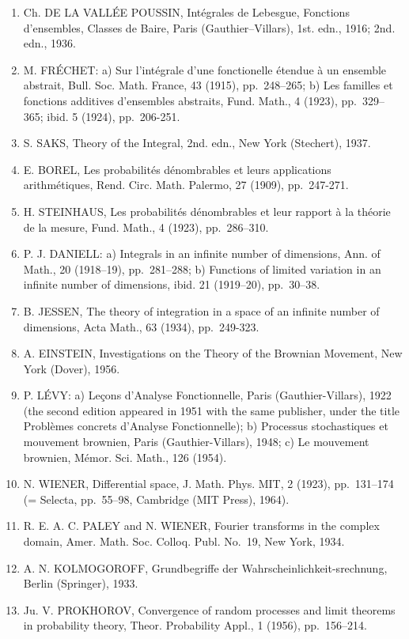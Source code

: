 \begin{enumerate}
\def\labelenumi{(\Roman{enumi})}
\item
  Ch. DE LA VALLÉE POUSSIN, Intégrales de Lebesgue, Fonctions d'ensembles, Classes de Baire, Paris (Gauthier--Villars), 1st. edn., 1916; 2nd. edn., 1936.
\item
  M. FRÉCHET: a) Sur l'intégrale d'une fonctionelle étendue à un ensemble abstrait, Bull. Soc. Math. France, 43 (1915), pp.~248--265; b) Les familles et fonctions additives d'ensembles abstraits, Fund. Math., 4 (1923), pp.~329--365; ibid. 5 (1924), pp.~206-251.
\item
  S. SAKS, Theory of the Integral, 2nd. edn., New York (Stechert), 1937.
\item
  E. BOREL, Les probabilités dénombrables et leurs applications arithmétiques, Rend. Circ. Math. Palermo, 27 (1909), pp.~247-271.
\item
  H. STEINHAUS, Les probabilités dénombrables et leur rapport à la théorie de la mesure, Fund. Math., 4 (1923), pp.~286--310.
\item
  P. J. DANIELL: a) Integrals in an infinite number of dimensions, Ann. of Math., 20 (1918--19), pp.~281--288; b) Functions of limited variation in an infinite number of dimensions, ibid. 21 (1919--20), pp.~30--38.
\item
  B. JESSEN, The theory of integration in a space of an infinite number of dimensions, Acta Math., 63 (1934), pp.~249-323.
\item
  A. EINSTEIN, Investigations on the Theory of the Brownian Movement, New York (Dover), 1956.
\item
  P. LÉVY: a) Leçons d'Analyse Fonctionnelle, Paris (Gauthier-Villars), 1922 (the second edition appeared in 1951 with the same publisher, under the title Problèmes concrets d'Analyse Fonctionnelle); b) Processus stochastiques et mouvement brownien, Paris (Gauthier-Villars), 1948; c) Le mouvement brownien, Mémor. Sci. Math., 126 (1954).
\item
  N. WIENER, Differential space, J. Math. Phys. MIT, 2 (1923), pp.~131--174 (= Selecta, pp.~55--98, Cambridge (MIT Press), 1964).
\item
  R. E. A. C. PALEY and N. WIENER, Fourier transforms in the complex domain, Amer. Math. Soc. Colloq. Publ. No.~19, New York, 1934.
\item
  A. N. KOLMOGOROFF, Grundbegriffe der Wahrscheinlichkeit-srechnung, Berlin (Springer), 1933.
\item
  Ju. V. PROKHOROV, Convergence of random processes and limit theorems in probability theory, Theor. Probability Appl., 1 (1956), pp.~156--214.

\end{enumerate}
